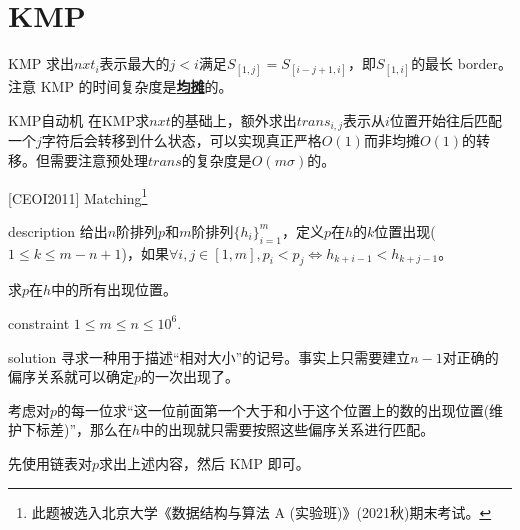 \documentclass{beamer}
\theoremstyle{compact}
\def\obj#1{\textbf{\uline{#1}}}
\def\le{\leqslant}
\begin{document}
\section{KMP}
\begin{frame}{KMP}
	求出$nxt_i$表示最大的$j < i$满足$S_{[1, j]} = S_{[i-j+1, i]}$，即$S_{[1, i]}$的最长 border。\\

	注意 KMP 的时间复杂度是\obj{均摊}的。
\end{frame}
\begin{frame}{KMP自动机}
	在KMP求$nxt$的基础上，额外求出$trans_{i,j}$表示从$i$位置开始往后匹配一个$j$字符后会转移到什么状态，可以实现真正严格$O(1)$而非均摊$O(1)$的转移。但需要注意预处理$trans$的复杂度是$O(m\sigma)$的。
\end{frame}
\begin{frame}{[CEOI2011] Matching\footnote{\tiny 此题被选入北京大学《数据结构与算法 A (实验班)》(2021秋)期末考试。}}
	\begin{block}{description}
		给出$n$阶排列$p$和$m$阶排列$\{h_i\}_{i=1}^{m}$，定义$p$在$h$的$k$位置出现($1 \le k \le m - n + 1$)，如果$\forall i, j \in [1, m], p_i < p_j \Leftrightarrow h_{k+i-1} < h_{k+j-1}$。

		求$p$在$h$中的所有出现位置。
	\end{block}
	\begin{block}{constraint}
		$1 \le m \le n \le 10^6.$
	\end{block}
	\pause
	\begin{block}{solution}
		寻求一种用于描述“相对大小”的记号。事实上只需要建立$n-1$对正确的偏序关系就可以确定$p$的一次出现了。\pause

		考虑对$p$的每一位求“这一位前面第一个大于和小于这个位置上的数的出现位置(维护下标差)”，那么在$h$中的出现就只需要按照这些偏序关系进行匹配。\pause

		先使用链表对$p$求出上述内容，然后 KMP 即可。

	\end{block}
\end{frame}
\end{document}
